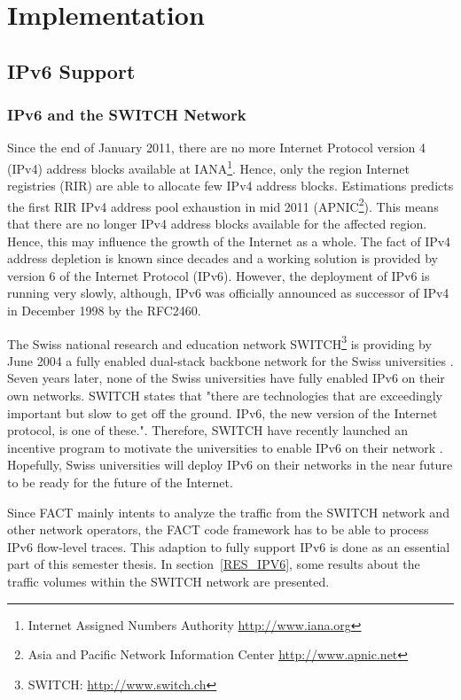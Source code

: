 \chapter{Implementation\label{Tasks}}

\section{IPv6 Support}
\subsection{IPv6 and the SWITCH Network}
Since the end of January 2011, there are no more Internet Protocol version 4 (IPv4) address blocks available at IANA\footnote{Internet Assigned Numbers Authority \url{http://www.iana.org}}. Hence, only the region Internet registries (RIR) are able to allocate few IPv4 address blocks. Estimations \cite{Huston:potaroo} predicts the first RIR IPv4 address pool exhaustion in mid 2011 (APNIC\footnote{Asia and Pacific Network Information Center \url{http://www.apnic.net}}). This means that there are no longer IPv4 address blocks available for the affected region. Hence, this may influence the growth of the Internet as a whole. The fact of IPv4 address depletion is known since decades and a working solution is provided by version 6 of the Internet Protocol (IPv6). However, the deployment of IPv6 is running very slowly, although, IPv6 was officially announced as successor of IPv4 in December 1998 by the RFC2460.

The Swiss national research and education network SWITCH\footnote{SWITCH: \url{http://www.switch.ch}} is providing by June 2004 a fully enabled dual-stack backbone network for the Swiss universities \cite{SWITCH:IPv6}. Seven years later, none of the Swiss universities have fully enabled IPv6 on their own networks. SWITCH states that "there are technologies that are exceedingly important but slow to get off the ground. IPv6, the new version of the Internet protocol, is one of these."\cite{SWITCH:IPv6_incent}. Therefore, SWITCH have recently launched an incentive program to motivate the universities to enable IPv6 on their network \cite{SWITCH:IPv6}. Hopefully, Swiss universities will deploy IPv6 on their networks in the near future to be ready for the future of the Internet.

Since FACT mainly intents to analyze the traffic from the SWITCH network and other network operators, the FACT code framework has to be able to process IPv6 flow-level traces. This adaption to fully support IPv6 is done as an essential part of this semester thesis. In section \ref{RES_IPV6}, some results about the traffic volumes within the SWITCH network are presented.


